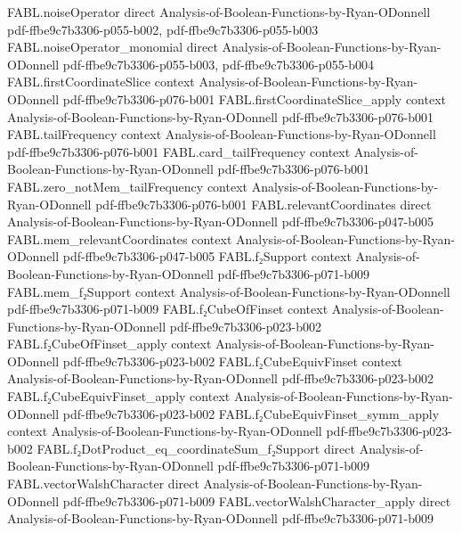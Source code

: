\begin{theorem}
  {FABL.noiseOperator}
  {direct}
  {Analysis-of-Boolean-Functions-by-Ryan-ODonnell}
  {pdf-ffbe9c7b3306-p055-b002,
    pdf-ffbe9c7b3306-p055-b003}
\proofstep
  {FABL.noiseOperator_monomial}
  {direct}
  {Analysis-of-Boolean-Functions-by-Ryan-ODonnell}
  {pdf-ffbe9c7b3306-p055-b003,
    pdf-ffbe9c7b3306-p055-b004}
\proofstep
  {FABL.firstCoordinateSlice}
  {context}
  {Analysis-of-Boolean-Functions-by-Ryan-ODonnell}
  {pdf-ffbe9c7b3306-p076-b001}
\proofstep
  {FABL.firstCoordinateSlice_apply}
  {context}
  {Analysis-of-Boolean-Functions-by-Ryan-ODonnell}
  {pdf-ffbe9c7b3306-p076-b001}
\proofstep
  {FABL.tailFrequency}
  {context}
  {Analysis-of-Boolean-Functions-by-Ryan-ODonnell}
  {pdf-ffbe9c7b3306-p076-b001}
\proofstep
  {FABL.card_tailFrequency}
  {context}
  {Analysis-of-Boolean-Functions-by-Ryan-ODonnell}
  {pdf-ffbe9c7b3306-p076-b001}
\proofstep
  {FABL.zero_notMem_tailFrequency}
  {context}
  {Analysis-of-Boolean-Functions-by-Ryan-ODonnell}
  {pdf-ffbe9c7b3306-p076-b001}
\proofstep
  {FABL.relevantCoordinates}
  {direct}
  {Analysis-of-Boolean-Functions-by-Ryan-ODonnell}
  {pdf-ffbe9c7b3306-p047-b005}
\proofstep
  {FABL.mem_relevantCoordinates}
  {context}
  {Analysis-of-Boolean-Functions-by-Ryan-ODonnell}
  {pdf-ffbe9c7b3306-p047-b005}
\proofstep
  {FABL.f₂Support}
  {context}
  {Analysis-of-Boolean-Functions-by-Ryan-ODonnell}
  {pdf-ffbe9c7b3306-p071-b009}
\proofstep
  {FABL.mem_f₂Support}
  {context}
  {Analysis-of-Boolean-Functions-by-Ryan-ODonnell}
  {pdf-ffbe9c7b3306-p071-b009}
\proofstep
  {FABL.f₂CubeOfFinset}
  {context}
  {Analysis-of-Boolean-Functions-by-Ryan-ODonnell}
  {pdf-ffbe9c7b3306-p023-b002}
\proofstep
  {FABL.f₂CubeOfFinset_apply}
  {context}
  {Analysis-of-Boolean-Functions-by-Ryan-ODonnell}
  {pdf-ffbe9c7b3306-p023-b002}
\proofstep
  {FABL.f₂CubeEquivFinset}
  {context}
  {Analysis-of-Boolean-Functions-by-Ryan-ODonnell}
  {pdf-ffbe9c7b3306-p023-b002}
\proofstep
  {FABL.f₂CubeEquivFinset_apply}
  {context}
  {Analysis-of-Boolean-Functions-by-Ryan-ODonnell}
  {pdf-ffbe9c7b3306-p023-b002}
\proofstep
  {FABL.f₂CubeEquivFinset_symm_apply}
  {context}
  {Analysis-of-Boolean-Functions-by-Ryan-ODonnell}
  {pdf-ffbe9c7b3306-p023-b002}
\proofstep
  {FABL.f₂DotProduct_eq_coordinateSum_f₂Support}
  {direct}
  {Analysis-of-Boolean-Functions-by-Ryan-ODonnell}
  {pdf-ffbe9c7b3306-p071-b009}
\proofstep
  {FABL.vectorWalshCharacter}
  {direct}
  {Analysis-of-Boolean-Functions-by-Ryan-ODonnell}
  {pdf-ffbe9c7b3306-p071-b009}
\proofstep
  {FABL.vectorWalshCharacter_apply}
  {direct}
  {Analysis-of-Boolean-Functions-by-Ryan-ODonnell}
  {pdf-ffbe9c7b3306-p071-b009}

\end{theorem}
